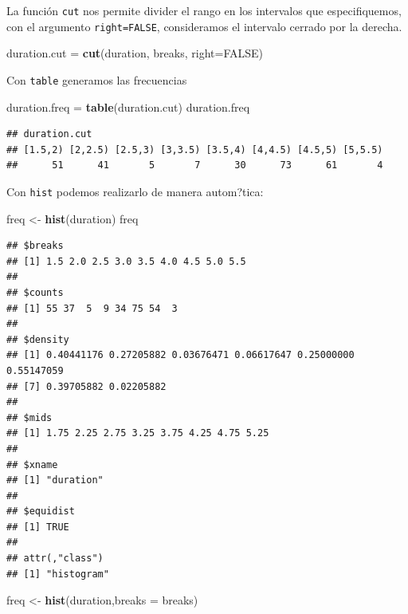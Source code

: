 \documentclass[]{book}
\newenvironment{Shaded}{\begin{snugshade}}{\end{snugshade}}
\newcommand{\KeywordTok}[1]{\textcolor[rgb]{0.13,0.29,0.53}{\textbf{#1}}}
\newcommand{\DataTypeTok}[1]{\textcolor[rgb]{0.13,0.29,0.53}{#1}}
\newcommand{\StringTok}[1]{\textcolor[rgb]{0.31,0.60,0.02}{#1}}
\newcommand{\OtherTok}[1]{\textcolor[rgb]{0.56,0.35,0.01}{#1}}
\newcommand{\NormalTok}[1]{#1}
\begin{document}
La función \texttt{cut} nos permite divider el rango en los intervalos
que especifiquemos, con el argumento \texttt{right=FALSE}, consideramos
el intervalo cerrado por la derecha.

\begin{Shaded}
\begin{Highlighting}[]
\NormalTok{duration.cut =}\StringTok{ }\KeywordTok{cut}\NormalTok{(duration, breaks, }\DataTypeTok{right=}\OtherTok{FALSE}\NormalTok{) }
\end{Highlighting}
\end{Shaded}

Con \texttt{table} generamos las frecuencias

\begin{Shaded}
\begin{Highlighting}[]
\NormalTok{duration.freq =}\StringTok{ }\KeywordTok{table}\NormalTok{(duration.cut) }
\NormalTok{duration.freq}
\end{Highlighting}
\end{Shaded}

\begin{verbatim}
## duration.cut
## [1.5,2) [2,2.5) [2.5,3) [3,3.5) [3.5,4) [4,4.5) [4.5,5) [5,5.5) 
##      51      41       5       7      30      73      61       4
\end{verbatim}

Con \texttt{hist} podemos realizarlo de manera autom?tica:

\begin{Shaded}
\begin{Highlighting}[]
\NormalTok{freq <-}\StringTok{ }\KeywordTok{hist}\NormalTok{(duration)}
\NormalTok{freq}
\end{Highlighting}
\end{Shaded}

\begin{verbatim}
## $breaks
## [1] 1.5 2.0 2.5 3.0 3.5 4.0 4.5 5.0 5.5
## 
## $counts
## [1] 55 37  5  9 34 75 54  3
## 
## $density
## [1] 0.40441176 0.27205882 0.03676471 0.06617647 0.25000000 0.55147059
## [7] 0.39705882 0.02205882
## 
## $mids
## [1] 1.75 2.25 2.75 3.25 3.75 4.25 4.75 5.25
## 
## $xname
## [1] "duration"
## 
## $equidist
## [1] TRUE
## 
## attr(,"class")
## [1] "histogram"
\end{verbatim}

\begin{Shaded}
\begin{Highlighting}[]
\NormalTok{freq <-}\StringTok{ }\KeywordTok{hist}\NormalTok{(duration,}\DataTypeTok{breaks =}\NormalTok{ breaks)}
\end{Highlighting}
\end{Shaded}
\end{document}
